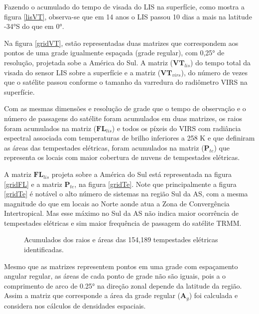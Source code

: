 Fazendo o acumulado do tempo de visada do LIS na superfície, como mostra a figura \ref{lisVT}, observa-se que em 14 anos o LIS passou 10 dias a mais na latitude -34°S do que em 0°.

Na figura \ref{gridVT}, estão representadas duas matrizes que correspondem aos pontos de uma grade igualmente espaçada (grade regular), com 0,25° de resolução, projetada sobe a América do Sul. A matriz ($\mathbf{VT}_{lis}$) do tempo total da visada do sensor LIS sobre a superfície e a matriz ($\mathbf{VT}_{virs}$), do número de vezes que o satélite passou conforme o tamanho da varredura do radiômetro VIRS na superfície.  

Com as mesmas dimensões e resolução de grade que o tempo de observação e o número de passagens do satélite foram acumulados em duas matrizes, os raios foram acumulados na matriz ($\mathbf{FL}_{lis}$) e todos os píxeis do VIRS com radiância espectral associada com temperaturas de brilho inferiores a 258 K e que definiram as áreas das tempestades elétricas, foram acumulados na matriz ($\mathbf{P}_{te}$) que representa os locais com maior cobertura de nuvens de tempestades elétricas.

A matriz $\mathbf{FL}_{lis}$ projeta sobre a América do Sul está representada na figura \ref{gridFL} e a matriz $\mathbf{P}_{te}$, na figura \ref{gridTe}. Note que principalmente a figura \ref{gridTe} é notável o alto número de sistemas na região Sul da AS, com a mesma magnitude do que em locais ao Norte aonde atua a Zona de Convergência Intertropical. Mas esse máximo no Sul da AS não indica maior ocorrência de tempestades elétricas e sim maior frequência de passagem do satélite TRMM.

\begin{figure}[hbp]

\caption{Acumulados dos raios e áreas das 154,189 tempestades elétricas identificadas.}
\label{gridSistemas} 
\end{figure} 

Mesmo que as matrizes representem pontos em uma grade com espaçamento angular regular, as áreas de cada ponto de grade não são iguais, pois a  o comprimento de arco de 0.25° na direção zonal depende da latitude da região. Assim a matriz que corresponde a área da grade regular ($\mathbf{A}_g$) foi calculada e considera nos cálculos de densidades espaciais.


